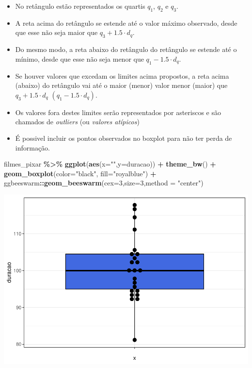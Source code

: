 \documentclass[
]{book}
\newenvironment{Shaded}{\begin{snugshade}}{\end{snugshade}}
\newcommand{\AttributeTok}[1]{\textcolor[rgb]{0.13,0.29,0.53}{#1}}
\newcommand{\DecValTok}[1]{\textcolor[rgb]{0.00,0.00,0.81}{#1}}
\newcommand{\FunctionTok}[1]{\textcolor[rgb]{0.13,0.29,0.53}{\textbf{#1}}}
\newcommand{\NormalTok}[1]{#1}
\newcommand{\SpecialCharTok}[1]{\textcolor[rgb]{0.81,0.36,0.00}{\textbf{#1}}}
\newcommand{\StringTok}[1]{\textcolor[rgb]{0.31,0.60,0.02}{#1}}
\begin{document}
\begin{itemize}
\item
  No retângulo estão representados os quartis \(q_1\), \(q_2\) e \(q_3\).\\
\item
  A reta acima do retângulo se estende até o valor máximo observado, desde que esse não seja maior que \(q_3 + 1.5 \cdot d_q\).\\
\item
  Do mesmo modo, a reta abaixo do retângulo do retângulo se estende até o mínimo, desde que esse não seja menor que \(q_1 - 1.5 \cdot d_q\).\\
\item
  Se houver valores que excedam os limites acima propostos, a reta acima (abaixo) do retângulo vai até o maior (menor) valor menor (maior) que \(q_3 + 1.5 \cdot d_q\) \(\left(q_1 - 1.5 \cdot d_q\right)\).\\
\item
  Os valores fora destes limites serão representados por asteriscos e são chamados de \emph{outliers} (ou \emph{valores atípicos})
\item
  É possivel incluir os pontos observados no boxplot para não ter perda de informação.
\end{itemize}

\begin{Shaded}
\begin{Highlighting}[]
\NormalTok{filmes\_pixar }\SpecialCharTok{\%\textgreater{}\%} \FunctionTok{ggplot}\NormalTok{(}\FunctionTok{aes}\NormalTok{(}\AttributeTok{x=}\StringTok{""}\NormalTok{,}\AttributeTok{y=}\NormalTok{duracao)) }\SpecialCharTok{+} \FunctionTok{theme\_bw}\NormalTok{() }\SpecialCharTok{+} 
  \FunctionTok{geom\_boxplot}\NormalTok{(}\AttributeTok{color=}\StringTok{"black"}\NormalTok{, }\AttributeTok{fill=}\StringTok{"royalblue"}\NormalTok{) }\SpecialCharTok{+} 
\NormalTok{  ggbeeswarm}\SpecialCharTok{::}\FunctionTok{geom\_beeswarm}\NormalTok{(}\AttributeTok{cex=}\DecValTok{3}\NormalTok{,}\AttributeTok{size=}\DecValTok{3}\NormalTok{,}\AttributeTok{method =} \StringTok{"center"}\NormalTok{)}
\end{Highlighting}
\end{Shaded}

\begin{center}\includegraphics{AED_files/figure-latex/boxplot_P_duracao-1} \end{center}
\end{document}

